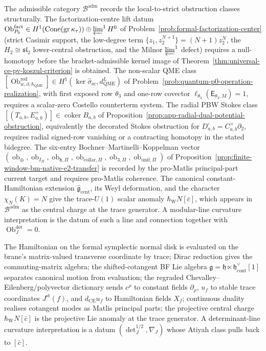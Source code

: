 \documentclass[11pt]{memoir}
\begin{document}
The admissible category $\mathcal B^{\mathrm{adm}}$ records the
local-to-strict obstruction classes structurally.  The factorization-centre
lift datum
$\operatorname{Ob}^{\mathrm{fact}}_{P_0}\in
H^1(\operatorname{Cone}(\operatorname{gr}\kappa_\tau))
\oplus\varprojlim^1H^0$
of Problem~\ref{prob:formal-factorization-center} (strict Casimir
support, the low-degree term $\{z_1,z_2^{N+1}\}=(N+1)z_2^N$, the
$H_2\cong\mathfrak{sl}_2$ lower-central obstruction, and the Milnor
$\varprojlim^1$ defect) requires a null-homotopy before the
bracket-admissible kernel image of
Theorem~\ref{thm:universal-ce-pv-koszul-criterion} is obtained.
The non-scalar QME class
$[\operatorname{Ob}^{\mathrm{red}}_{w,\partial,\hbar_{\mathrm{QME}}}]
\in H^1(\ker\widehat\sigma_{\mathrm{sc}},d_{\mathrm{QME}}^{L})$ of
Problem~\ref{prob:quantum-p0-operation-realization}, with first
exposed row $\theta_3$ and one-row covector
$\ell_{\theta_3}(\mathsf E_{\theta_3,M})=1$, requires a scalar-zero
Costello counterterm system.  The radial PBW Stokes
class
$[(T_{a,b},E^+_{a,b})]\in\operatorname{coker}B_{a,b}$ of
Proposition~\ref{prop:app-radial-dual-potential-obstruction},
equivalently the decorated Stokes obstruction for
$D^\square_{a,b}=C^+_{a,b}\partial_2$, requires radial signed-row
vanishing or a contracting homotopy in the stated bidegree.  The
six-entry
Bochner--Martinelli--Koppelman vector
$(\operatorname{ob}_\oplus,\operatorname{ob}_{I_\Pi},
\operatorname{ob}_{\mathfrak h,\Pi},
\operatorname{ob}_{\mathrm{collar},\Pi},
\operatorname{ob}_{3,\Pi},\operatorname{ob}_{\mathrm{unif},\Pi})$ of
Proposition~\ref{prop:finite-window-bm-native-e2-transfer} is
  recorded by the pro-Matlis principal-part current target and requires
  pro-Matlis coherence.  The canonical constant-Hamiltonian extension
  $\widehat{\mathfrak g}_{\mathrm{cent}}$, its Weyl deformation, and the
  character \(\chi_N(K)=N\) give the trace-$U(1)$ scalar anomaly
  \(\hbar_{\mathrm{W}}N[\bar c]\), which appears in
  $\mathcal B^{\mathrm{adm}}$ as the central charge at the trace
  generator.  A modular-line curvature interpretation is the datum of
  such a line and connection together with
  \(\operatorname{Ob}^{\det}_J=0\).

The Hamiltonian on the formal symplectic normal disk is evaluated on
the brane's matrix-valued transverse coordinate by trace; Dirac
reduction gives the commuting-matrix algebra; the shifted-cotangent
BF Lie algebra
$\mathfrak g=\mathfrak h\ltimes\mathfrak h^\vee_{\mathrm{cont}}[1]$
separates canonical motion from evaluation; the
regraded Chevalley--Eilenberg/polyvector dictionary sends
$c^\rho$ to constant fields $\partial_\rho$, $u_f$ to stable trace
coordinates $J^{\mathrm{st}}(f)$, and $d_{\mathrm{CE}}u_f$ to
Hamiltonian fields $X_f$; continuous duality realises
cotangent modes as Matlis principal parts; the projective central
charge \(\hbar_{\mathrm{W}}N[\bar c]\) is the projective Lie anomaly at the trace
generator.  A determinant-line curvature interpretation is a datum
\((\det_J^{1/2},\nabla_J)\) whose Atiyah class pulls back to
\([\bar c]\).
\end{document}
